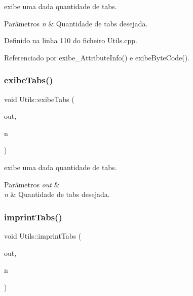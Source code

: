 exibe uma dada quantidade de tabs. 
\begin{DoxyParams}{Parâmetros}
{\em n} & Quantidade de tabs desejada. \\
\hline
\end{DoxyParams}


Definido na linha 110 do ficheiro Utils.\+cpp.



Referenciado por exibe\+\_\+\+Attribute\+Info() e exibe\+Byte\+Code().

\mbox{\label{classUtils_aebfca2747bb35554f74b1ad6abe7c2c3}} 
\subsubsection{\texorpdfstring{exibe\+Tabs()}{exibeTabs()}\hspace{0.1cm}{\footnotesize\ttfamily [2/2]}}
{\footnotesize\ttfamily void Utils\+::exibe\+Tabs (\begin{DoxyParamCaption}\item[{F\+I\+LE $\ast$}]{out,  }\item[{uint8\+\_\+t}]{n }\end{DoxyParamCaption})}

exibe uma dada quantidade de tabs. 
\begin{DoxyParams}{Parâmetros}
{\em out} & \\
\hline
{\em n} & Quantidade de tabs desejada. \\
\hline
\end{DoxyParams}
\mbox{\label{classUtils_a932c28783170c6aa53362fbd0c4ceefa}} 
\subsubsection{\texorpdfstring{imprint\+Tabs()}{imprintTabs()}}
{\footnotesize\ttfamily void Utils\+::imprint\+Tabs (\begin{DoxyParamCaption}\item[{F\+I\+LE $\ast$}]{out,  }\item[{uint8\+\_\+t}]{n }\end{DoxyParamCaption})\hspace{0.3cm}{\ttfamily [static]}}

